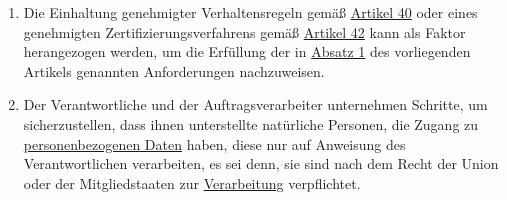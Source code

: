 \begin{enumerate}
  \item Die Einhaltung genehmigter Verhaltensregeln gemäß \hyperref[ch:40]{Artikel 40} oder eines genehmigten
   Zertifizierungsverfahrens gemäß \hyperref[ch:42]{Artikel 42} kann als Faktor herangezogen werden, um die Erfüllung
   der in \hyperref[itm:32-1]{Absatz 1} des vorliegenden Artikels genannten Anforderungen nachzuweisen.
  \label{itm:32-3}

  \item Der Verantwortliche und der Auftragsverarbeiter unternehmen Schritte, um sicherzustellen, dass ihnen
   unterstellte natürliche Personen, die Zugang zu \hyperref[itm:04-1]{personenbezogenen Daten} haben, diese nur auf Anweisung des
   Verantwortlichen verarbeiten, es sei denn, sie sind nach dem Recht der Union oder der Mitgliedstaaten zur
   \hyperref[itm:04-2]{Verarbeitung} verpflichtet.
  \label{itm:32-4}

\end{enumerate}


